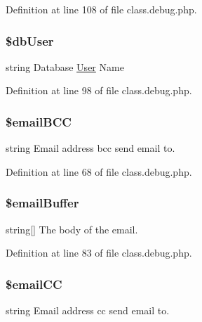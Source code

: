 Definition at line 108 of file class.\-debug.\-php.

\hypertarget{class_debug_a4a92606de85aafdc0dcae4976b7ca669}{
\subsubsection[{\$db\-User}]{\setlength{\rightskip}{0pt plus 5cm}\$db\-User\hspace{0.3cm}{\ttfamily [static]}}}\label{class_debug_a4a92606de85aafdc0dcae4976b7ca669}
string Database \hyperlink{class_user}{User} Name 

Definition at line 98 of file class.\-debug.\-php.

\hypertarget{class_debug_ace2c8fd77a23d56cfdc35a142df1b1ab}{
\subsubsection[{\$email\-B\-C\-C}]{\setlength{\rightskip}{0pt plus 5cm}\$email\-B\-C\-C\hspace{0.3cm}{\ttfamily [static]}}}\label{class_debug_ace2c8fd77a23d56cfdc35a142df1b1ab}
string Email address bcc send email to. 

Definition at line 68 of file class.\-debug.\-php.

\hypertarget{class_debug_a6da5505f5274a47a70fb0cbac5eef25e}{
\subsubsection[{\$email\-Buffer}]{\setlength{\rightskip}{0pt plus 5cm}\$email\-Buffer\hspace{0.3cm}{\ttfamily [static]}}}\label{class_debug_a6da5505f5274a47a70fb0cbac5eef25e}
string\mbox{[}\mbox{]} The body of the email. 

Definition at line 83 of file class.\-debug.\-php.

\hypertarget{class_debug_aef55490ba633a1821bc784c7c5e5a5e5}{
\subsubsection[{\$email\-C\-C}]{\setlength{\rightskip}{0pt plus 5cm}\$email\-C\-C\hspace{0.3cm}{\ttfamily [static]}}}\label{class_debug_aef55490ba633a1821bc784c7c5e5a5e5}
string Email address cc send email to. 

